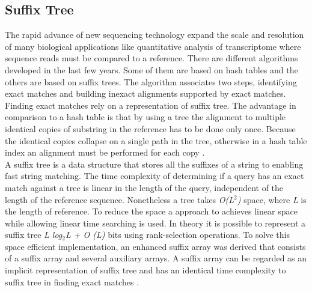 \documentclass[12pt, a4paper]{report}
\begin{document}
\subsection{Suffix Tree}
The rapid advance of new sequencing technology expand the scale and resolution of many biological applications like quantitative analysis of transcriptome where sequence reads must be compared to a reference. There are different algorithms developed in the last few years. Some of them are based on hash tables and the others are based on suffix trees. The algorithm associates two steps, identifying exact matches and building inexact alignments supported by exact matches. Finding exact matches rely on a representation of suffix tree. 
The advantage in comparison to a hash table is that by using a tree the alignment to multiple identical copies of substring in the reference has to be done only once. Because the identical copies collapse on a single path in the tree, otherwise in a hash table index an alignment must be performed for each copy \cite{Li2010}. \\
A suffix tree is a data structure that stores all the suffixes of a string to enabling fast string matching. The time complexity of determining if a query has an exact match against a tree is linear in the length of the query, independent of the length of the reference sequence. Nonetheless a tree takes \textit{O(L$^2$)} space, where \textit{L} is the length of reference. To reduce the space a approach to achieves linear space while allowing linear time searching is used. In theory it is possible to represent a suffix tree \textit{L log$_2$L + O (L)} bits using rank-selection operations. To solve this space efficient implementation,  an enhanced suffix array was derived that consists of a suffix array and several auxiliary arrays. A suffix array can be regarded as an implicit representation of suffix tree and has an identical time complexity to suffix tree in finding exact matches \cite{Li2010}. 

\end{document}
